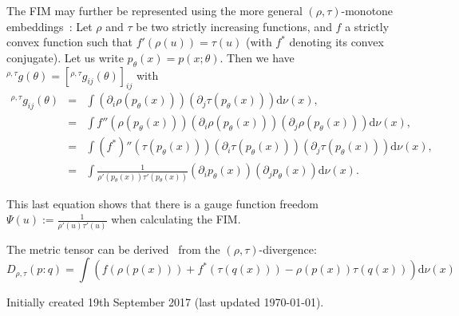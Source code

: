 \documentclass[11pt]{article}
\def\dnu{\mathrm{d}\nu}
\def\leftsup#1{{}^{#1}}
\begin{document}
The FIM may further be represented using the more general $(\rho,\tau)$-monotone embeddings~\cite{naudts2018rho}:
Let $\rho$ and $\tau$ be two strictly increasing functions, and $f$ a strictly convex function such that $f'(\rho(u))=\tau(u)$ (with $f^*$ denoting its convex conjugate).
Let us write $p_\theta(x)=p(x;\theta)$. Then we have $\leftsup{\rho,\tau}g(\theta)=[\leftsup{\rho,\tau}g_{ij}(\theta)]_{ij}$ with
\begin{eqnarray}
\leftsup{\rho,\tau}g_{ij}(\theta) &=& \int \left(\partial_i\rho(p_\theta(x))\right)   \left(\partial_j\tau(p_\theta(x))\right) \dnu(x),\\
&=& \int f''(\rho(p_\theta(x)))  \left(\partial_i\rho(p_\theta(x))\right) \left(\partial_j\rho(p_\theta(x))\right)\dnu(x),\\
&=& \int (f^*)''(\tau(p_\theta(x))) \left(\partial_i\tau(p_\theta(x))\right) \left(\partial_j\tau(p_\theta(x))\right) \dnu(x),\\
&=& \int \frac{1}{\rho'(p_\theta(x)) \tau'(p_\theta(x)) }  \left(\partial_i p_\theta(x) \right) \left(\partial_j p_\theta(x) \right)\dnu(x).
\end{eqnarray} 

This last equation shows that there is a gauge function freedom $\Psi(u):=\frac{1}{\rho'(u) \tau'(u) }$ when calculating the FIM.

The metric tensor can be derived~\cite{nielsen2018elementary} from the $(\rho,\tau)$-divergence:
\begin{equation}
D_{\rho,\tau}(p:q)=\int \left( f(\rho(p(x))) + f^*(\tau(q(x))) - \rho(p(x))\tau(q(x)) \right)  \dnu(x)
\end{equation}


\vskip 1cm
Initially created 19th September 2017 (last updated \today).



\end{document}
